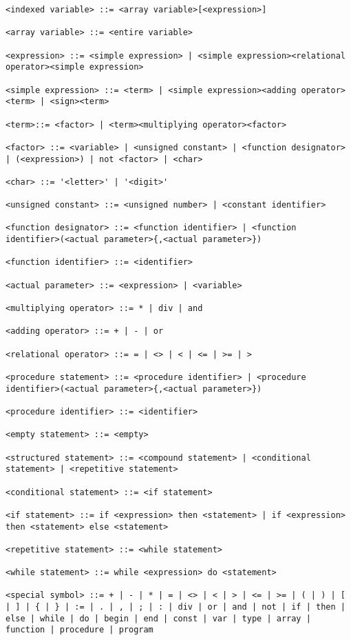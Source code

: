\documentclass[a4paper,oneside]{report}
\begin{document}
\begin{verbatim}
<indexed variable> ::= <array variable>[<expression>]

<array variable> ::= <entire variable>

<expression> ::= <simple expression> | <simple expression><relational operator><simple expression>

<simple expression> ::= <term> | <simple expression><adding operator><term> | <sign><term>

<term>::= <factor> | <term><multiplying operator><factor>

<factor> ::= <variable> | <unsigned constant> | <function designator> | (<expression>) | not <factor> | <char>

<char> ::= '<letter>' | '<digit>'

<unsigned constant> ::= <unsigned number> | <constant identifier>

<function designator> ::= <function identifier> | <function identifier>(<actual parameter>{,<actual parameter>})

<function identifier> ::= <identifier>

<actual parameter> ::= <expression> | <variable>

<multiplying operator> ::= * | div | and

<adding operator> ::= + | - | or

<relational operator> ::= = | <> | < | <= | >= | >

<procedure statement> ::= <procedure identifier> | <procedure identifier>(<actual parameter>{,<actual parameter>})

<procedure identifier> ::= <identifier>

<empty statement> ::= <empty>

<structured statement> ::= <compound statement> | <conditional statement> | <repetitive statement>

<conditional statement> ::= <if statement>

<if statement> ::= if <expression> then <statement> | if <expression> then <statement> else <statement>

<repetitive statement> ::= <while statement>

<while statement> ::= while <expression> do <statement>

<special symbol> ::= + | - | * | = | <> | < | > | <= | >= | ( | ) | [ | ] | { | } | := | . | , | ; | : | div | or | and | not | if | then | else | while | do | begin | end | const | var | type | array | function | procedure | program

\end{verbatim}
\end{document}
